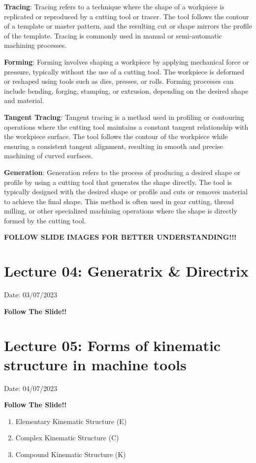 \documentclass{article}
\begin{document}
\textbf{Tracing}: Tracing refers to a technique where the shape of a workpiece is replicated or reproduced by a cutting tool or tracer. The tool follows the contour of a template or master pattern, and the resulting cut or shape mirrors the profile of the template. Tracing is commonly used in manual or semi-automatic machining processes.

\textbf{Forming}: Forming involves shaping a workpiece by applying mechanical force or pressure, typically without the use of a cutting tool. The workpiece is deformed or reshaped using tools such as dies, presses, or rolls. Forming processes can include bending, forging, stamping, or extrusion, depending on the desired shape and material.

\textbf{Tangent Tracing}: Tangent tracing is a method used in profiling or contouring operations where the cutting tool maintains a constant tangent relationship with the workpiece surface. The tool follows the contour of the workpiece while ensuring a consistent tangent alignment, resulting in smooth and precise machining of curved surfaces.

\textbf{Generation}: Generation refers to the process of producing a desired shape or profile by using a cutting tool that generates the shape directly. The tool is typically designed with the desired shape or profile and cuts or removes material to achieve the final shape. This method is often used in gear cutting, thread milling, or other specialized machining operations where the shape is directly formed by the cutting tool.

\vspace*{1cm}
\textbf{FOLLOW SLIDE IMAGES FOR BETTER UNDERSTANDING!!!} 
\hrulefill

\section{Lecture 04: Generatrix \& Directrix} 
\hfill Date: 03/07/2023

\vspace*{1cm}
\textbf{Follow The Slide!!}
\hrulefill

\section{Lecture 05: Forms of kinematic structure in machine tools} 
\hfill Date: 04/07/2023

\vspace*{1cm}
\textbf{Follow The Slide!!} \\
\begin{enumerate}
  \item Elementary Kinematic Structure (E)
  \item Complex Kinematic Structure (C) 
  \item Compound Kinematic Structure (K) 
\end{enumerate}
\end{document}
